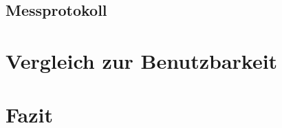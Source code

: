 \section{Messprotokoll}

\chapter{Vergleich zur Benutzbarkeit}

\chapter{Fazit}




\listoffigures %
\listoftables %

